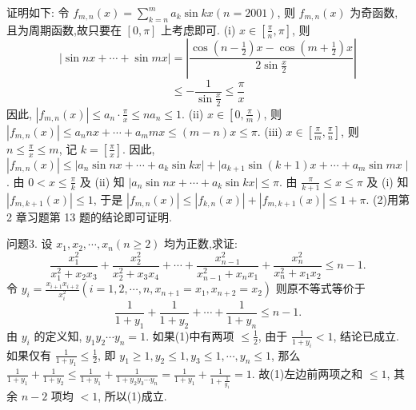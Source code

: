 证明如下:
令 $f_{m, n}(x)=\sum_{k=n}^m a_k \sin k x(n=2001)$, 则 $f_{m, n}(x)$ 为奇函数, 且为周期函数,故只要在 $[0, \pi]$ 上考虑即可.
(i) $x \in\left[\frac{\pi}{n}, \pi\right]$, 则
$$
|\sin n x+\cdots+\sin m x|=\left|\frac{\cos \left(n-\frac{1}{2}\right) x-\cos \left(m+\frac{1}{2}\right) x}{2 \sin \frac{x}{2}}\right|
$$
$$
\leqslant-\frac{1}{\sin \frac{x}{2}} \leqslant \frac{\pi}{x}
$$
因此, $\left|f_{m, n}(x)\right| \leqslant a_n \cdot \frac{\pi}{x} \leqslant n a_n \leqslant 1$.
(ii) $x \in\left[0, \frac{\pi}{m}\right)$, 则 $\left|f_{m, n}(x)\right| \leqslant a_n n x+\cdots+a_m m x \leqslant(m-n) x \leqslant \pi$.
(iii) $x \in\left[\frac{\pi}{m}, \frac{\pi}{n}\right]$, 则 $n \leqslant \frac{\pi}{x} \leqslant m$, 记 $k=\left[\frac{\pi}{x}\right]$.
因此, $\left|f_{m, n}(x)\right| \leqslant\left|a_n \sin n x+\cdots+a_k \sin k x\right|+\mid a_{k+1} \sin (k+1) x+\cdots+ a_m \sin m x \mid$.
由 $0<x \leqslant \frac{\pi}{k}$ 及 (ii) 知 $\left|a_n \sin n x+\cdots+a_k \sin k x\right| \leqslant \pi$.
由 $\frac{\pi}{k+1} \leqslant x \leqslant \pi$ 及 (i) 知 $\left|f_{m, k+1}(x)\right| \leqslant 1$, 于是 $\left|f_{m, n}(x)\right| \leqslant\left|f_{k, n}(x)\right|+ \left|f_{m, k+1}(x)\right| \leqslant 1+\pi$.
(2)用第 2 章习题第 13 题的结论即可证明.



问题3. 设 $x_1, x_2, \cdots, x_n(n \geqslant 2)$ 均为正数,求证:
$$
\frac{x_1^2}{x_1^2+x_2 x_3}+\frac{x_2^2}{x_2^2+x_3 x_4}+\cdots+\frac{x_{n-1}^2}{x_{n-1}^2+x_n x_1}+\frac{x_n^2}{x_n^2+x_1 x_2} \leqslant n-1 .
$$
令 $y_{i}={\frac{x_{i+1}x_{i+2}}{x_{i}^{2}}} (i = 1,2,\cdots,n,x_{n+1} =x_1,x_{n+2}=x_2)$ 则原不等式等价于
$$
\frac{1}{1+y_1}+\frac{1}{1+y_2}+\cdots+\frac{1}{1+y_n} \leqslant n-1 . \label{(1)}
$$
由 $y_i$ 的定义知, $y_1 y_2 \cdots y_n=1$.
如果(1)中有两项 $\leqslant \frac{1}{2}$, 由于 $\frac{1}{1+y_i}<1$, 结论已成立.
如果仅有 $\frac{1}{1+y_1} \leqslant \frac{1}{2}$, 即 $y_1 \geqslant 1, y_2 \leqslant 1, y_3 \leqslant 1, \cdots, y_n \leqslant 1$, 那么 $\frac{1}{1+y_1}+\frac{1}{1+y_2} \leqslant \frac{1}{1+y_1}+\frac{1}{1+y_2 y_3 \cdots y_n}=\frac{1}{1+y_1}+\frac{1}{1+\frac{1}{y_1}}=1$.
故(1)左边前两项之和 $\leqslant 1$, 其余 $n-2$ 项均 $<1$, 所以(1)成立.



